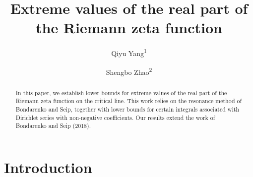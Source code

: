 \documentclass[12pt,reqno]{amsart}
\theoremstyle{definition}
\numberwithin{equation}{section}
\begin{document}
	
	
	\baselineskip=17pt
	
	
	\title[Extreme values of the real part of the Riemann zeta function]{Extreme values of the real part of the Riemann zeta function}
	
	
	\author{Qiyu Yang\textsuperscript{1}}
    \author{Shengbo Zhao\textsuperscript{2}}
	\address{1.School of Mathematics and Statistics, Henan Normal University, Xinxiang 453007, CHINA}
	\address{2.School of Mathematical Sciences, Key Laboratory of Intelligent Computing and Applications (Tongji University), Ministry of Education, Tongji University, Shanghai 200092, China}

	
	\begin{abstract} 
	   In this paper, we establish lower bounds for extreme values of the real part of the Riemann zeta function on the critical line. This work relies on the resonance method of Bondarenko and Seip, together with lower bounds for certain integrals associated with Dirichlet series with non-negative coefficients. Our results extend the work of Bondarenko and Seip (2018).
	\end{abstract}
	
	
	
	\maketitle

\section{Introduction}
\label{secintroduction}
\end{document}
